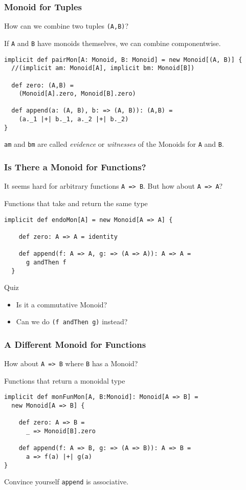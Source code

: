 \documentclass{beamer}
\begin{document}
\begin{frame}[fragile]\frametitle{Monoid for Tuples}
  How can we combine two tuples \texttt{(A,B)}?
  \pause

  If \texttt{A} and \texttt{B} have monoids themselves, we can \alert{combine componentwise}.

  \begin{block}{}
  \begin{lstlisting}
implicit def pairMon[A: Monoid, B: Monoid] = new Monoid[(A, B)] {
  //(implicit am: Monoid[A], implicit bm: Monoid[B])

  def zero: (A,B) =
    (Monoid[A].zero, Monoid[B].zero)

  def append(a: (A, B), b: => (A, B)): (A,B) =
    (a._1 |+| b._1, a._2 |+| b._2)
}
  \end{lstlisting}
  \end{block}

  \texttt{am} and \texttt{bm} are called \emph{evidence} or
  \emph{witnesses} of the Monoids for \texttt{A} and \texttt{B}.
\end{frame}


\begin{frame}[fragile]\frametitle{Is There a Monoid for Functions?}
  It seems hard for arbitrary functions \texttt{A => B}.
  \pause
  But how about \alert{\texttt{A => A}}?

  \pause
  \begin{block}{Functions that take and return the same type}

  \begin{lstlisting}
implicit def endoMon[A] = new Monoid[A => A] {

    def zero: A => A = identity

    def append(f: A => A, g: => (A => A)): A => A =
      g andThen f
  }
  \end{lstlisting}
  \end{block}
  \begin{block}{Quiz}
    \begin{itemize}
      \item Is it a commutative Monoid?
      \item Can we do \texttt{(f andThen g)} instead?
    \end{itemize}
  \end{block}
\end{frame}


\begin{frame}[fragile]
  \frametitle{A Different Monoid for Functions}
  How about \texttt{A => B} where \alert{\texttt{B} has a Monoid?}

  \begin{block}{Functions that return a monoidal type}
  \begin{lstlisting}
implicit def monFunMon[A, B:Monoid]: Monoid[A => B] =
  new Monoid[A => B] {

    def zero: A => B =
      _ => Monoid[B].zero

    def append(f: A => B, g: => (A => B)): A => B =
      a => f(a) |+| g(a)
}
  \end{lstlisting}
  \end{block}
  Convince yourself \texttt{append} is associative.
\end{frame}
\end{document}
